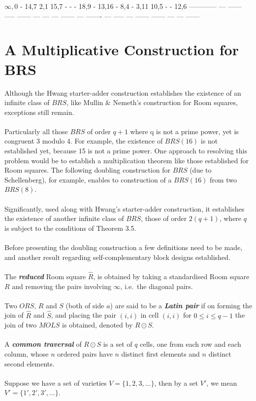 \documentclass[
  12pt,
  a4paper]{book}
\begin{document}
\(\infty,0\) - 14,7 2,1 15,7 - - - 18,9 - 13,16 - 8,4 - 3,11 10,5 - -
12,6 ------------ --- ------ ----- ------ --- --- --- ------ --- -------
--- ----- --- ------ ------ --- --- ------

\hypertarget{a-multiplicative-construction-for-brs}{%
\section{A Multiplicative Construction for
BRS}\label{a-multiplicative-construction-for-brs}}

Although the Hwang starter-adder construction establishes the existence
of an infinite class of \(BRS\), like Mullin \& Nemeth's construction
for Room squares, exceptions still remain.\\
~\\
Particularly all those \(BRS\) of order \(q+1\) where q is not a prime
power, yet is congruent 3 modulo 4. For example, the existence of
\(BRS(16)\) is not established yet, because 15 is not a prime power. One
approach to resolving this problem would be to establish a
multiplication theorem like those established for Room squares. The
following doubling construction for \(BRS\) (due to Schellenberg), for
example, enables to construction of a \(BRS(16)\) from two \(BRS(8)\).\\
~\\
Significantly, used along with Hwang's starter-adder construction, it
establishes the existence of another infinite class of \(BRS\), those of
order \(2(q+1)\), where \(q\) is subject to the conditions of Theorem
3.5.\\
~\\
Before presenting the doubling construction a few definitions need to be
made, and another result regarding self-complementary block designs
established.\\
~\\
The \textbf{\emph{reduced}} Room square \(\hat{R}\), is obtained by
taking a standardised Room square \(R\) and removing the pairs involving
\(\infty\), i.e.~the diagonal pairs.\\
~\\
Two \(ORS\), \(R\) and \(S\) (both of side \(a\)) are said to be a
\textbf{\emph{Latin pair}} if on forming the join of \(\hat{R}\) and
\(\hat{S}\), and placing the pair \((i,i)\) in cell \((i,i)\) for
\(0 \leq i \leq q-1\) the join of two \(MOLS\) is obtained, denoted by
\(R \odot S\).\\
~\\
A \textbf{\emph{common traversal}} of \(R \odot S\) is a set of \(q\)
cells, one from each row and each column, whose \(n\) ordered pairs have
\(n\) distinct first elements and \(n\) distinct second elements.\\
~\\
Suppose we have a set of varieties \(V = \{1,2,3,...\}\), then by a set
\(V'\), we mean \(V'=\{1',2',3',...\}\).
\end{document}
